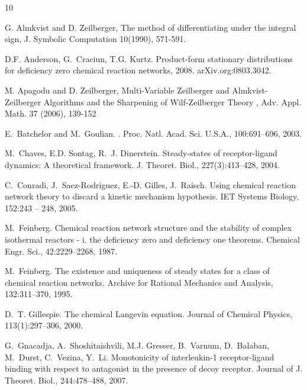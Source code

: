 \documentclass[11pt]{article}
\begin{document}
\begin{thebibliography}{10}

\newcommand{\optionalemph}[1]{#1} %
\newcommand{\optionalbf}[1]{#1}   %

G. Almkvist and D. Zeilberger,
\optionalemph{The method of differentiating under the
integral sign}, J. Symbolic Computation \optionalbf{10}(1990), 571-591.
 
D.F. Anderson, G.~Craciun,  T.G. Kurtz.
\newblock Product-form stationary distributions for deficiency zero chemical
  reaction networks, 2008.
\newblock arXiv.org:0803.3042.

M. Apagodu  and D. Zeilberger,
\optionalemph{Multi-Variable Zeilberger and Almkvist-Zeilberger Algorithms and the
Sharpening of Wilf-Zeilberger Theory },
Adv. Appl. Math. \optionalbf{37} (2006), 139-152

E.~Batchelor and M.~Goulian.
.
\newblock \optionalemph{ Proc. Natl. Acad. Sci. U.S.A.}, 100:691--696, 2003.

M.~Chaves, E.D. Sontag,  R.~J. Dinerstein.
\newblock Steady-states of receptor-ligand dynamics: {A} theoretical framework.
\newblock \optionalemph{ J. Theoret. Biol.}, 227(3):413--428, 2004.

C.~Conradi, J.~Saez-Rodriguez, E.-D. Gilles,  J.~Raisch.
\newblock Using chemical reaction network theory to discard a kinetic mechanism
  hypothesis.
\newblock \optionalemph{IET Systems Biology}, 152:243 -- 248, 2005.

M.~Feinberg.
\newblock Chemical reaction network structure and the stability of complex
  isothermal reactors - i. the deficiency zero and deficiency one theorems.
\newblock \optionalemph{ Chemical Engr. Sci.}, 42:2229--2268, 1987.

M.~Feinberg.
\newblock The existence and uniqueness of steady states for a class of chemical
  reaction networks.
\newblock \optionalemph{ Archive for Rational Mechanics and Analysis}, 132:311--370,
  1995.

D.~T. Gillespie.
\newblock The chemical Langevin equation.
\newblock \optionalemph{ Journal of Chemical Physics}, 113(1):297--306, 2000.

G.~Gnacadja, A.~Shoshitaishvili, M.J. Gresser, B.~Varnum, D.~Balaban, M.~Durst,
  C.~Vezina, Y.~Li.
\newblock Monotonicity of interleukin-1 receptor-ligand binding with respect to
  antagonist in the presence of decoy receptor.
\newblock \optionalemph{ Journal of J. Theoret. Biol.}, 244:478--488, 2007.


\end{thebibliography}
\end{document}
